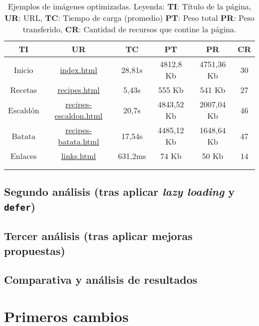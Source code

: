 \documentclass{article}
\begin{document}
\begin{longtable}{c|c|c|c|c|c}
    \hline
    \textbf{TI} & \textbf{UR} & \textbf{TC} & \textbf{PT} & \textbf{PR} & \textbf{CR} \\
    \endhead
    \hline
    Inicio & \href{https://www.danielramos.me/hhyc-dramosac/index.html}{index.html} & 28,81s & 4812,8 Kb & 4751,36 Kb & 30 \\
    Recetas & \href{https://www.danielramos.me/hhyc-dramosac/recipes.html}{recipes.html} & 5,43s & 555 Kb & 541 Kb & 27 \\
    Escaldón & \href{https://www.danielramos.me/hhyc-dramosac/recipes-escaldon.html}{recipes-escaldon.html} & 20,7s & 4843,52 Kb & 2007,04 Kb & 46 \\
    Batata & \href{https://www.danielramos.me/hhyc-dramosac/recipes-batata.html}{recipes-batata.html} & 17,54s & 4485,12 Kb & 1648,64 Kb & 47 \\
    Enlaces & \href{https://www.danielramos.me/hhyc-dramosac/links.html}{links.html} & 631,2ms & 74 Kb & 50 Kb & 14 \\
    \hline
     \\[1.5ex]
     \caption{
          Ejemplos de imágenes optimizadas.
          Leyenda: 
          \textbf{TI}: Título de la página, 
          \textbf{UR}: URL, 
          \textbf{TC}: Tiempo de carga (promedio) 
          \textbf{PT}: Peso total 
          \textbf{PR}: Peso transferido, 
          \textbf{CR}: Cantidad de recursos que contine la página.
     }
    \label{tab:imagenes-optimizadas}
\end{longtable}

\subsection{Segundo análisis (tras aplicar \textit{lazy loading} y \texttt{defer})}\label{sec:segundo-analisis}

\subsection{Tercer análisis (tras aplicar mejoras propuestas)}\label{sec:tercer-analisis}

\subsection{Comparativa y análisis de resultados}\label{sec:comparativa-y-analisis-de-resultados}

\section{Primeros cambios}\label{sec:primeros-cambios}
\end{document}
